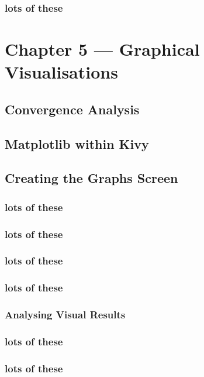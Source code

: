 \documentclass{article}
\begin{document}
\subsubsection{lots of these}


\section{Chapter 5 --- Graphical Visualisations}

\subsection{Convergence Analysis}

\subsection{Matplotlib within Kivy}

\subsection{Creating the Graphs Screen}

\subsubsection{lots of these}

\subsubsection{lots of these}

\subsubsection{lots of these}

\subsubsection{lots of these}

\subsubsection{Analysing Visual Results}

\subsubsection{lots of these}

\subsubsection{lots of these}
\end{document}
